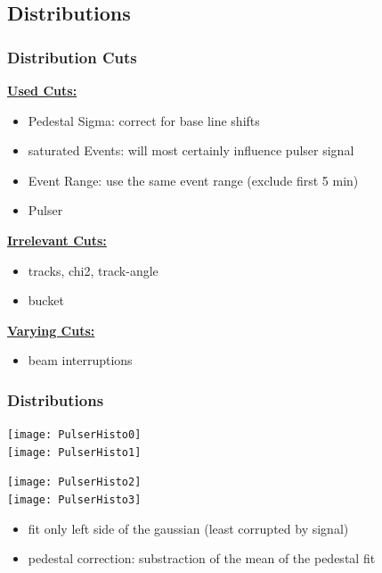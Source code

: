 \documentclass[9pt]{beamer}
\begin{document}
\subsection{Distributions}
\begin{frame}
	\frametitle{Distribution Cuts}
	\underline{\textbf{Used Cuts:}}
	\begin{itemize}
		\setlength{\itemsep}{\fill}
		\item Pedestal Sigma: correct for base line shifts
		\item saturated Events: will most certainly influence pulser signal 
		\item Event Range: use the same event range (exclude first 5 min)
		\item Pulser
	\end{itemize}
	\vspace*{10pt}
	\underline{\textbf{Irrelevant Cuts:}}
	\begin{itemize}
		\setlength{\itemsep}{\fill}
		\item tracks, chi2, track-angle
		\item bucket
	\end{itemize}
	\vspace*{10pt}
	\underline{\textbf{Varying Cuts:}}
	\begin{itemize}
		\setlength{\itemsep}{\fill}
		\item beam interruptions
	\end{itemize}
\end{frame}
\begin{frame}
	\frametitle{Distributions}
	\begin{center}
		\begin{minipage}{3.5cm}
			\centering
			\texttt{[image: PulserHisto0]}\\
			\texttt{[image: PulserHisto1]}
		\end{minipage}
		\begin{minipage}{3.5cm}
			\centering
			\texttt{[image: PulserHisto2]}\\
			\texttt{[image: PulserHisto3]}
		\end{minipage}
		\begin{minipage}[c][.5\textheight]{4cm}
			\begin{itemize}
				\setlength{\itemsep}{\fill}	
				\item fit only left side of the gaussian (least corrupted by signal)
				\item pedestal correction: substraction of the mean of the pedestal fit
			\end{itemize}
		\end{minipage}
	\end{center}
\end{frame}
\end{document}

